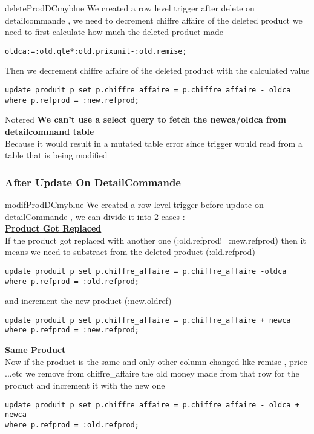 \begin{prettyBox}{deleteProdDC}{myblue}
We created a row level trigger after delete on detailcommande , we need to decrement chiffre affaire of the deleted product 
we need to first calculate how much the deleted product made 

\begin{lstlisting}
oldca:=:old.qte*:old.prixunit-:old.remise;
\end{lstlisting}

Then we decrement chiffre affaire of the deleted product with the calculated value

\begin{lstlisting}
update produit p set p.chiffre_affaire = p.chiffre_affaire - oldca 
where p.refprod = :new.refprod;
\end{lstlisting}

\end{prettyBox}

\vspace{1cm}

\begin{prettyBox}{Note}{red}
\textbf{We can't use a select query to fetch the newca/oldca from detailcommand table}\\[0.15cm]
Because it would result in a mutated table error since trigger would read from a table that is being modified
\end{prettyBox}

\newpage
\subsubsection*{After Update On DetailCommande}


\begin{prettyBox}{modifProdDC}{myblue}
We created a row level trigger before update on detailCommande , we can divide it into 2 cases : \\[0.15cm]
\textbf{\underline{Product Got Replaced}}\\[0.15cm]
If the product got replaced with another one (:old.refprod!=:new.refprod) then it means we need to substract from the deleted product (:old.refprod) 
\begin{lstlisting}
update produit p set p.chiffre_affaire = p.chiffre_affaire -oldca 
where p.refprod = :old.refprod;
\end{lstlisting}
and increment the new product (:new.oldref)
\begin{lstlisting}
update produit p set p.chiffre_affaire = p.chiffre_affaire + newca 
where p.refprod = :new.refprod;
\end{lstlisting}

\textbf{\underline{Same Product}}\\[0.15cm]
Now if the product is the same and only other column changed like remise , price ...etc we remove from chiffre\_affaire the old
money made from that row for the product and increment it with the new one 
\begin{lstlisting}
update produit p set p.chiffre_affaire = p.chiffre_affaire - oldca + newca 
where p.refprod = :old.refprod;
\end{lstlisting}
\end{prettyBox}

